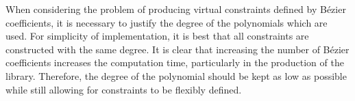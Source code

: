 When considering the problem of producing virtual constraints defined by Bézier coefficients, it is necessary to justify the degree of the polynomials which are used. For simplicity of implementation, it is best that all constraints are constructed with the same degree. It is clear that increasing the number of Bézier coefficients increases the computation time, particularly in the production of the library. Therefore, the degree of the polynomial should be kept as low as possible while still allowing for constraints to be flexibly defined.